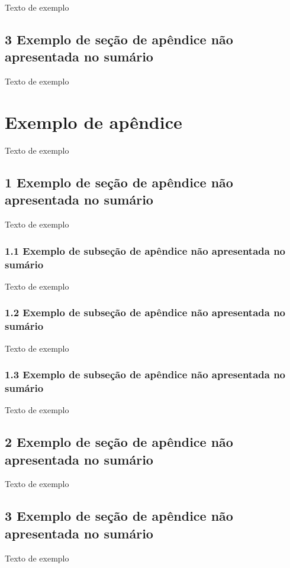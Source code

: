 \documentclass[
	12pt,				%
	oneside,			%
	a4paper,			%
	english,			%
	brazil				%
	]{abntex2ppgsi}
\begin{document}
\begin{apendicesenv}
Texto de exemplo

\section*{3 Exemplo de seção de apêndice não apresentada no sumário}

Texto de exemplo


\chapter{Exemplo de apêndice}

Texto de exemplo

\section*{1 Exemplo de seção de apêndice não apresentada no sumário}

Texto de exemplo

\subsection*{1.1 Exemplo de subseção de apêndice não apresentada no sumário}

Texto de exemplo

\subsection*{1.2 Exemplo de subseção de apêndice não apresentada no sumário}

Texto de exemplo

\subsection*{1.3 Exemplo de subseção de apêndice não apresentada no sumário}

Texto de exemplo

\section*{2 Exemplo de seção de apêndice não apresentada no sumário}

Texto de exemplo

\section*{3 Exemplo de seção de apêndice não apresentada no sumário}

Texto de exemplo




\end{apendicesenv}
\end{document}
